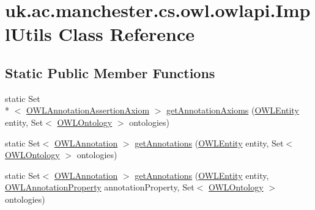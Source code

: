 \hypertarget{classuk_1_1ac_1_1manchester_1_1cs_1_1owl_1_1owlapi_1_1_impl_utils}{\section{uk.\-ac.\-manchester.\-cs.\-owl.\-owlapi.\-Impl\-Utils Class Reference}
\label{classuk_1_1ac_1_1manchester_1_1cs_1_1owl_1_1owlapi_1_1_impl_utils}
}
\subsection*{Static Public Member Functions}
\begin{DoxyCompactItemize}
\item 
static Set\\*
$<$ \hyperlink{interfaceorg_1_1semanticweb_1_1owlapi_1_1model_1_1_o_w_l_annotation_assertion_axiom}{O\-W\-L\-Annotation\-Assertion\-Axiom} $>$ \hyperlink{classuk_1_1ac_1_1manchester_1_1cs_1_1owl_1_1owlapi_1_1_impl_utils_a02f8b2f734b4e026f9c0102149b1de7d}{get\-Annotation\-Axioms} (\hyperlink{interfaceorg_1_1semanticweb_1_1owlapi_1_1model_1_1_o_w_l_entity}{O\-W\-L\-Entity} entity, Set$<$ \hyperlink{interfaceorg_1_1semanticweb_1_1owlapi_1_1model_1_1_o_w_l_ontology}{O\-W\-L\-Ontology} $>$ ontologies)
\item 
static Set$<$ \hyperlink{interfaceorg_1_1semanticweb_1_1owlapi_1_1model_1_1_o_w_l_annotation}{O\-W\-L\-Annotation} $>$ \hyperlink{classuk_1_1ac_1_1manchester_1_1cs_1_1owl_1_1owlapi_1_1_impl_utils_a6cb063064c0023a7dd41cb71fd9faa7e}{get\-Annotations} (\hyperlink{interfaceorg_1_1semanticweb_1_1owlapi_1_1model_1_1_o_w_l_entity}{O\-W\-L\-Entity} entity, Set$<$ \hyperlink{interfaceorg_1_1semanticweb_1_1owlapi_1_1model_1_1_o_w_l_ontology}{O\-W\-L\-Ontology} $>$ ontologies)
\item 
static Set$<$ \hyperlink{interfaceorg_1_1semanticweb_1_1owlapi_1_1model_1_1_o_w_l_annotation}{O\-W\-L\-Annotation} $>$ \hyperlink{classuk_1_1ac_1_1manchester_1_1cs_1_1owl_1_1owlapi_1_1_impl_utils_a6c05c2479216fbb5cc5e9b2d514c48c1}{get\-Annotations} (\hyperlink{interfaceorg_1_1semanticweb_1_1owlapi_1_1model_1_1_o_w_l_entity}{O\-W\-L\-Entity} entity, \hyperlink{interfaceorg_1_1semanticweb_1_1owlapi_1_1model_1_1_o_w_l_annotation_property}{O\-W\-L\-Annotation\-Property} annotation\-Property, Set$<$ \hyperlink{interfaceorg_1_1semanticweb_1_1owlapi_1_1model_1_1_o_w_l_ontology}{O\-W\-L\-Ontology} $>$ ontologies)
\end{DoxyCompactItemize}


